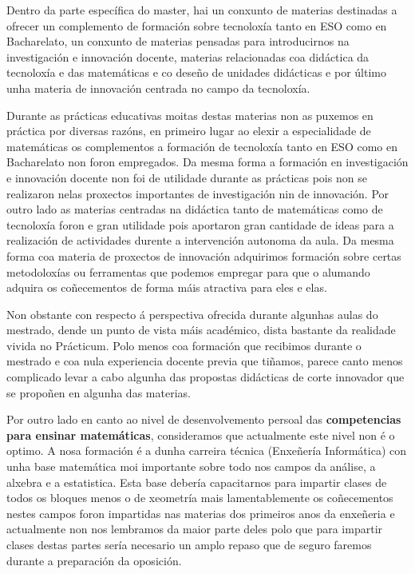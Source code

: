 Dentro da parte específica do master, hai un conxunto de materias destinadas a ofrecer un complemento de formación sobre tecnoloxía tanto en ESO como en Bacharelato, un conxunto de materias pensadas para introducirnos na investigación e innovación docente, materias relacionadas coa didáctica da tecnoloxía e das matemáticas e co deseño de unidades didácticas e por último unha materia de innovación centrada no campo da tecnoloxía.

Durante as prácticas educativas moitas destas materias non as puxemos en práctica por diversas razóns, en primeiro lugar ao elexir a especialidade de matemáticas os complementos a formación de tecnoloxía tanto en ESO como en Bacharelato non foron empregados. Da mesma forma a formación en investigación e innovación docente non foi de utilidade durante as prácticas pois non se realizaron nelas proxectos importantes de investigación nin de innovación. Por outro lado as materias centradas na didáctica tanto de matemáticas como de tecnoloxía foron e gran utilidade pois aportaron gran cantidade de ideas para a realización de actividades durente a intervención autonoma da aula. Da mesma forma coa materia de proxectos de innovación adquirimos formación sobre certas metodoloxías ou ferramentas que podemos empregar para que o alumando adquira os coñecementos de forma máis atractiva para eles e elas.

Non obstante con respecto á perspectiva ofrecida durante algunhas aulas do mestrado, dende un punto de vista máis académico, dista bastante da realidade vivida no Prácticum. Polo menos coa formación que recibimos durante o mestrado e coa nula experiencia docente previa que tiñamos, parece canto menos complicado levar a cabo algunha das propostas didácticas de corte innovador que se propoñen en algunha das materias.


Por outro lado en canto ao nivel de desenvolvemento persoal das \textbf{competencias para ensinar matemáticas}, consideramos que actualmente este nivel non é o optimo. A nosa formación é a dunha carreira técnica (Enxeñería Informática) con unha base matemática moi importante sobre todo nos campos da análise, a alxebra e a estatistica. Esta base debería capacitarnos para impartir clases de todos os bloques menos o de xeometría mais lamentablemente os coñecementos nestes campos foron impartidas nas materias dos primeiros anos da enxeñeria e actualmente non nos lembramos da maior parte deles polo que para impartir clases destas partes sería necesario un amplo repaso que de seguro faremos durante a preparación da oposición.
